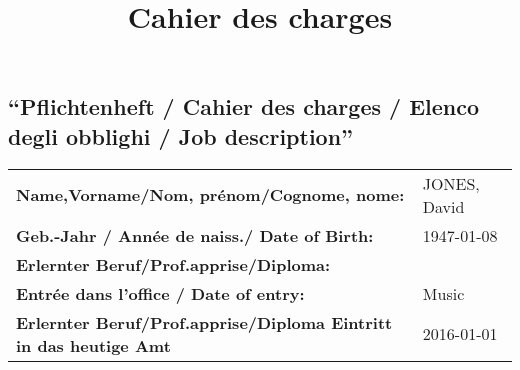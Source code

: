\documentclass[
]{article}
\title{Cahier des charges}
\author{}
\date{\vspace{-2.5em}}
\begin{document}
\maketitle

\hypertarget{pflichtenheft-cahier-des-charges-elenco-degli-obblighi-job-description}{%
\subsection{``Pflichtenheft / Cahier des charges / Elenco degli obblighi
/ Job
description''}\label{pflichtenheft-cahier-des-charges-elenco-degli-obblighi-job-description}}

\begin{longtable}[]{@{}ll@{}}
\toprule
\endhead
\begin{minipage}[t]{0.45\columnwidth}\raggedright
\textbf{Name,Vorname/Nom, prénom/Cognome, nome:}\strut
\end{minipage} & \begin{minipage}[t]{0.49\columnwidth}\raggedright
JONES, David\strut
\end{minipage}\tabularnewline
\begin{minipage}[t]{0.45\columnwidth}\raggedright
\textbf{Geb.-Jahr / Année de naiss./ Date of Birth:}\strut
\end{minipage} & \begin{minipage}[t]{0.49\columnwidth}\raggedright
1947-01-08\strut
\end{minipage}\tabularnewline
\begin{minipage}[t]{0.45\columnwidth}\raggedright
\textbf{Erlernter Beruf/Prof.apprise/Diploma:}\strut
\end{minipage} & \begin{minipage}[t]{0.49\columnwidth}\raggedright
\strut
\end{minipage}\tabularnewline
\begin{minipage}[t]{0.45\columnwidth}\raggedright
\textbf{Entrée dans l'office / Date of entry:}\strut
\end{minipage} & \begin{minipage}[t]{0.49\columnwidth}\raggedright
Music\strut
\end{minipage}\tabularnewline
\begin{minipage}[t]{0.45\columnwidth}\raggedright
\textbf{Erlernter Beruf/Prof.apprise/Diploma Eintritt in das heutige
Amt}\strut
\end{minipage} & \begin{minipage}[t]{0.49\columnwidth}\raggedright
2016-01-01\strut
\end{minipage}\tabularnewline

\end{longtable}
\end{document}
